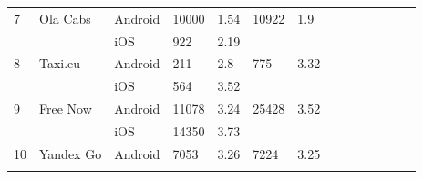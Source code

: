 \documentclass[12pt]{article}
\begin{document}
\begin{table}
\begin{tabular}{p{0.5cm}lp{1.5cm}lp{2cm}lp{2cm}lp{2cm}lp{2cm}lp{2cm}l}
7           & Ola Cabs          & Android     & 10000                                                                    & 1.54                                                                       & 10922                                                                             & 1.9                                \\
            &                   & iOS         & 922                                                                      & 2.19                                                                       &                                                                                   &                                    \\
8           & Taxi.eu           & Android     & 211                                                                      & 2.8                                                                        & 775                                                                               & 3.32                               \\
            &                   & iOS         & 564                                                                      & 3.52                                                                       &                                                                                   &                                    \\
9           & Free Now          & Android     & 11078                                                                    & 3.24                                                                       & 25428                                                                             & 3.52                               \\
            &                   & iOS         & 14350                                                                    & 3.73                                                                       &                                                                                   &                                    \\
10          & Yandex Go         & Android     & 7053                                                                     & 3.26                                                                       & 7224                                                                              & 3.25                               \\
\hline
\label{tab:total_reviews_rating}
\end{tabular}
\end{table}
\end{document}
